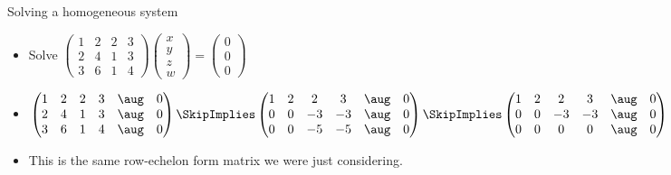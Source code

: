 \documentclass{beamer}
\begin{document}
\begin{frame}{Solving a homogeneous system}
\begin{itemize}
\item Solve
$
\begin{pmatrix}
1 & 2 & 2 & 3 \\
2 & 4 & 1 & 3 \\
3 & 6 & 1 & 4
\end{pmatrix}
\begin{pmatrix}
x \\ y \\ z \\ w
\end{pmatrix}=
\begin{pmatrix}
0 \\ 0 \\ 0
\end{pmatrix}
$
\item
$
\begin{pmatrix}
1 & 2 & 2 & 3 & \aug & 0 \\
2 & 4 & 1 & 3 & \aug & 0  \\
3 & 6 & 1 & 4 & \aug & 0
\end{pmatrix}
\SkipImplies
\begin{pmatrix}
1 & 2 & 2 & 3 & \aug & 0  \\
0 & 0 & -3 & -3  & \aug & 0  \\
0 & 0 & -5 & -5 & \aug & 0
\end{pmatrix}
\SkipImplies
\begin{pmatrix}
1 & 2 & 2 & 3    & \aug & 0  \\
0 & 0 & -3 & -3  & \aug & 0  \\
0 & 0 & 0 & 0    & \aug & 0
\end{pmatrix}
$
\item This is the same row-echelon form matrix we were just considering.
\end{itemize}
\end{frame}
\end{document}
